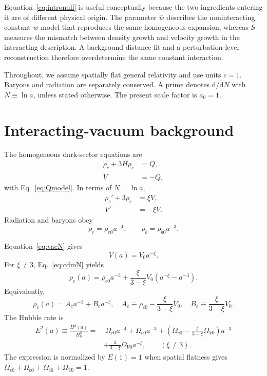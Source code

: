 \documentclass[11pt]{article}
\theoremstyle{remark}
\newcommand{\dd}{\mathrm d}
\begin{document}
Equation~\eqref{eq:intronull} is useful conceptually because the two ingredients entering it are of different physical origin.  The parameter $\bar w$ describes the noninteracting constant-$w$ model that reproduces the same homogeneous expansion, whereas $S$ measures the mismatch between density growth and velocity growth in the interacting description.  A background distance fit and a perturbation-level reconstruction therefore overdetermine the same constant interaction.

Throughout, we assume spatially flat general relativity and use units $c=1$.  Baryons and radiation are separately conserved.  A prime denotes $\dd/\dd N$ with $N\equiv\ln a$, unless stated otherwise.  The present scale factor is $a_0=1$.

\section{Interacting-vacuum background}
\label{sec:background}

The homogeneous dark-sector equations are
\begin{align}
    \dot\rho_c+3H\rho_c &= Q,\label{eq:cdmcontinuity}\\
    \dot V &= -Q,\label{eq:vaccontinuity}
\end{align}
with Eq.~\eqref{eq:Qmodel}.  In terms of $N=\ln a$,
\begin{align}
    \rho_c'+3\rho_c &= \xi V,\label{eq:cdmN}\\
    V'&=-\xi V.\label{eq:vacN}
\end{align}
Radiation and baryons obey
\begin{equation}
    \rho_r=\rho_{r0}a^{-4},
    \qquad
    \rho_b=\rho_{b0}a^{-3}.
\end{equation}

Equation~\eqref{eq:vacN} gives
\begin{equation}
    V(a)=V_0 a^{-\xi}.
    \label{eq:Vsolution}
\end{equation}
For $\xi\neq3$, Eq.~\eqref{eq:cdmN} yields
\begin{equation}
    \rho_c(a)
    =\rho_{c0}a^{-3}
    +\frac{\xi}{3-\xi}V_0\left(a^{-\xi}-a^{-3}\right).
    \label{eq:rhocsolution}
\end{equation}
Equivalently,
\begin{equation}
    \rho_c(a)
    = A_c a^{-3}+B_c a^{-\xi},
    \quad
    A_c\equiv \rho_{c0}-\frac{\xi}{3-\xi}V_0,
    \quad
    B_c\equiv\frac{\xi}{3-\xi}V_0.
    \label{eq:AB}
\end{equation}
The Hubble rate is
\begin{align}
    E^2(a)\equiv\frac{H^2(a)}{H_0^2}
    =&\;\Omega_{r0}a^{-4}+\Omega_{b0}a^{-3}
    +\left(\Omega_{c0}-\frac{\xi}{3-\xi}\Omega_{V0}\right)a^{-3}
    \nonumber\\
    &+\frac{3}{3-\xi}\Omega_{V0}a^{-\xi},
    \qquad (\xi\neq3).
    \label{eq:Ebackground}
\end{align}
The expression is normalized by $E(1)=1$ when spatial flatness gives
$\Omega_{r0}+\Omega_{b0}+\Omega_{c0}+\Omega_{V0}=1$.
\end{document}
